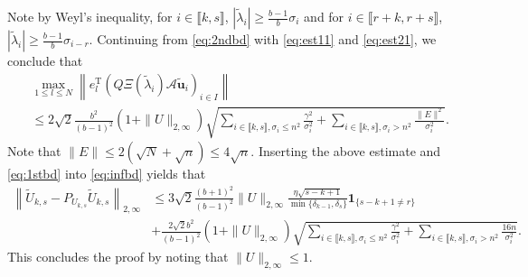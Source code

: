 \documentclass[reqno]{amsart}
\newcommand{\T}{\mathrm{T}}
\theoremstyle{plain}
\theoremstyle{definition}
\begin{document}
Note by Weyl's inequality, for $i\in \llbracket k, s \rrbracket$, $|\widetilde{\lambda}_i| \ge \frac{b-1}{b} \sigma_i$ and for $i\in \llbracket r+k, r+s\rrbracket$, $|\widetilde{\lambda}_i| \ge \frac{b-1}{b} \sigma_{i-r}$. Continuing from \eqref{eq:2ndbd} with \eqref{eq:est11} and \eqref{eq:est21}, we conclude that
\begin{align*}
&\max_{1\le l \le N} \left\|e_l^\T (Q \Xi(\widetilde \lambda_i) \mathcal A \widetilde{\mathbf u}_i)_{i\in I}\right\|\\
&\le 2\sqrt{2}\frac{b^2}{(b-1)^2} (1+ \|  U \|_{2,\infty}) \sqrt{\sum_{i\in \llbracket k, s\rrbracket, \sigma_i\le n^2} \frac{\gamma^2}{\sigma_i^2} + \sum_{i\in \llbracket k, s\rrbracket, \sigma_i> n^2} \frac{\| E\|^2}{\sigma_i^2}}.
\end{align*}
Note that $\|E\|\le 2(\sqrt N + \sqrt n) \le 4\sqrt n$. Inserting the above estimate and \eqref{eq:1stbd} into \eqref{eq:infbd} yields that 
\begin{align*}
\left\|\widetilde U_{k,s}-P_{U_{k,s}}\widetilde U_{k,s} \right\|_{2,\infty}  & \le 3\sqrt{2}\frac{(b+1)^2}{(b-1)^2}  \| U \|_{2,\infty} \frac{\eta\sqrt{s-k+1}}{\min\{\delta_{k-1}, \delta_s\}} \mathbf{1}_{\{s-k+1\neq r\}}\\
& + \frac{2\sqrt{2} b^2}{(b-1)^2} (1+ \| U \|_{2,\infty}) \sqrt{\sum_{i\in \llbracket k, s\rrbracket, \sigma_i\le n^2} \frac{\gamma^2}{\sigma_i^2} + \sum_{i\in \llbracket k, s\rrbracket, \sigma_i> n^2} \frac{16 n}{\sigma_i^2}}.
\end{align*}
This concludes the proof by noting that $\|U\|_{2,\infty} \le 1$. 
\end{document}
